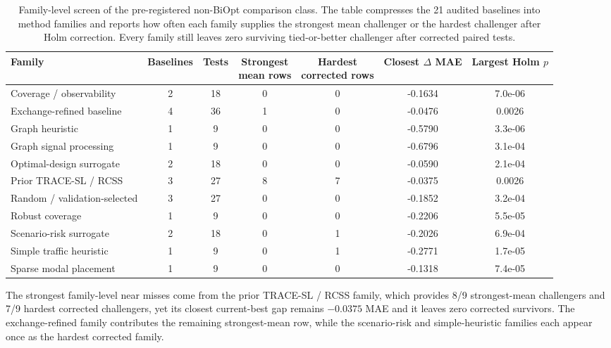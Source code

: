 \begin{table}[pos=htbp]
\centering
\caption{Family-level screen of the pre-registered non-BiOpt comparison class. The table compresses the 21 audited baselines into method families and reports how often each family supplies the strongest mean challenger or the hardest challenger after Holm correction. Every family still leaves zero surviving tied-or-better challenger after corrected paired tests.}
\label{tab:trace-biopt-baseline-family-screen}
\small
\setlength{\tabcolsep}{4pt}
\begin{tabular}{>{\raggedright\arraybackslash}p{}cccccc}
\toprule
Family & Baselines & Tests & \makecell[c]{Strongest\\mean rows} & \makecell[c]{Hardest\\corrected rows} & \makecell[c]{Closest $\Delta$\\MAE} & \makecell[c]{Largest\\Holm $p$} \\
\midrule
Coverage / observability & 2 & 18 & 0 & 0 & -0.1634 & 7.0e-06 \\
Exchange-refined baseline & 4 & 36 & 1 & 0 & -0.0476 & 0.0026 \\
Graph heuristic & 1 & 9 & 0 & 0 & -0.5790 & 3.3e-06 \\
Graph signal processing & 1 & 9 & 0 & 0 & -0.6796 & 3.1e-04 \\
Optimal-design surrogate & 2 & 18 & 0 & 0 & -0.0590 & 2.1e-04 \\
Prior TRACE-SL / RCSS & 3 & 27 & 8 & 7 & -0.0375 & 0.0026 \\
Random / validation-selected & 3 & 27 & 0 & 0 & -0.1852 & 3.2e-04 \\
Robust coverage & 1 & 9 & 0 & 0 & -0.2206 & 5.5e-05 \\
Scenario-risk surrogate & 2 & 18 & 0 & 1 & -0.2026 & 6.9e-04 \\
Simple traffic heuristic & 1 & 9 & 0 & 1 & -0.2771 & 1.7e-05 \\
Sparse modal placement & 1 & 9 & 0 & 0 & -0.1318 & 7.4e-05 \\
\bottomrule
\end{tabular}
\vspace{0.35em}
\parbox{0.96\textwidth}{\small The strongest family-level near misses come from the prior TRACE-SL / RCSS family, which provides 8/9 strongest-mean challengers and 7/9 hardest corrected challengers, yet its closest current-best gap remains $-0.0375$ MAE and it leaves zero corrected survivors. The exchange-refined family contributes the remaining strongest-mean row, while the scenario-risk and simple-heuristic families each appear once as the hardest corrected family.}
\end{table}
